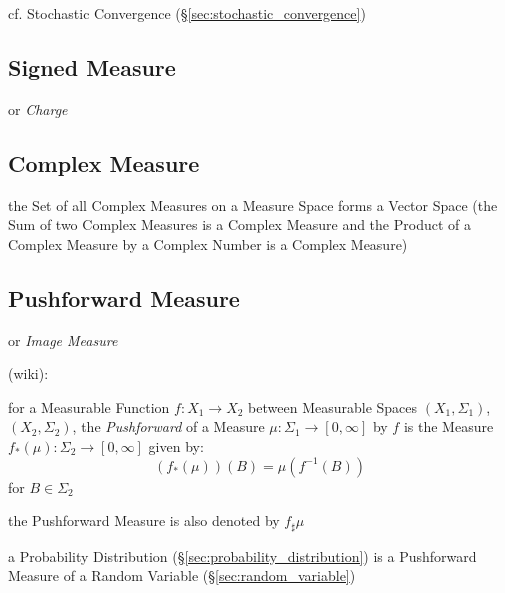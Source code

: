 cf. Stochastic Convergence (\S\ref{sec:stochastic_convergence})



\subsection{Signed Measure}\label{sec:signed_measure}

or \emph{Charge}



\subsection{Complex Measure}\label{sec:complex_measure}

the Set of all Complex Measures on a Measure Space forms a Vector Space (the Sum
of two Complex Measures is a Complex Measure and the Product of a Complex
Measure by a Complex Number is a Complex Measure)



\subsection{Pushforward Measure}\label{sec:pushforward_measure}

or \emph{Image Measure}

(wiki):

for a Measurable Function $f : X_1 \rightarrow X_2$ between Measurable Spaces
$(X_1, \Sigma_1)$, $(X_2, \Sigma_2)$, the \emph{Pushforward} of a Measure
$\mu : \Sigma_1 \rightarrow [0, \infty]$ by $f$ is the Measure
$f_*(\mu) : \Sigma_2 \rightarrow [0, \infty]$ given by:
\[
  (f_*(\mu))(B) = \mu(f^{-1}(B))
\]
for $B \in \Sigma_2$

the Pushforward Measure is also denoted by $f_\sharp\mu$

\fist a Probability Distribution (\S\ref{sec:probability_distribution}) is a
Pushforward Measure of a Random Variable (\S\ref{sec:random_variable})



